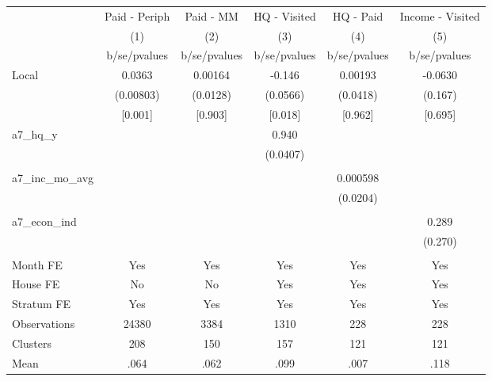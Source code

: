 {
\def\sym#1{\ifmmode^{#1}\else\(^{#1}\)\fi}
\begin{tabular}{l*{5}{c}}
\toprule
                &\multicolumn{1}{c}{Paid - Periph}&\multicolumn{1}{c}{Paid - MM}&\multicolumn{1}{c}{HQ - Visited}&\multicolumn{1}{c}{HQ - Paid}&\multicolumn{1}{c}{Income - Visited}\\
                &\multicolumn{1}{c}{(1)}&\multicolumn{1}{c}{(2)}&\multicolumn{1}{c}{(3)}&\multicolumn{1}{c}{(4)}&\multicolumn{1}{c}{(5)}\\
                &b/se/pvalues&b/se/pvalues&b/se/pvalues&b/se/pvalues&b/se/pvalues\\
\midrule
Local           &   0.0363&  0.00164&   -0.146&  0.00193&  -0.0630\\
                &(0.00803)& (0.0128)& (0.0566)& (0.0418)&  (0.167)\\
                &  [0.001]&  [0.903]&  [0.018]&  [0.962]&  [0.695]\\
a7\_hq\_y         &         &         &    0.940&         &         \\
                &         &         & (0.0407)&         &         \\
                &         &         &         &         &         \\
a7\_inc\_mo\_avg   &         &         &         & 0.000598&         \\
                &         &         &         & (0.0204)&         \\
                &         &         &         &         &         \\
a7\_econ\_ind     &         &         &         &         &    0.289\\
                &         &         &         &         &  (0.270)\\
                &         &         &         &         &         \\
Month FE        &      Yes&      Yes&      Yes&      Yes&      Yes\\
House FE        &       No&       No&      Yes&      Yes&      Yes\\
Stratum FE      &      Yes&      Yes&      Yes&      Yes&      Yes\\
\midrule
Observations    &    24380&     3384&     1310&      228&      228\\
Clusters        &      208&      150&      157&      121&      121\\
Mean            &     .064&     .062&     .099&     .007&     .118\\
\bottomrule
\end{tabular}
}
